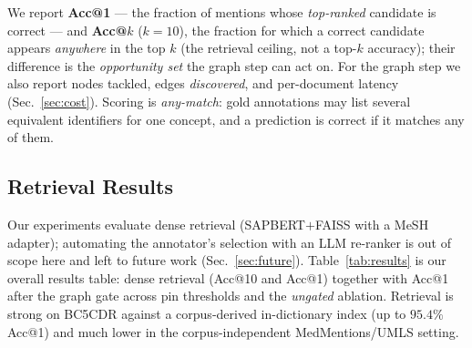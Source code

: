 \documentclass[runningheads]{llncs}
\begin{document}
\begin{table}[t]
\caption{Evaluation datasets and their role. Mentions as train\,/\,dev\,/\,test
where applicable; KB = target knowledge base. BC5CDR and the BioNNE-R case study
drive the graph analysis; MedMentions establishes the retrieval gap.}
\label{tab:datasets}
\centering
\footnotesize
{}
\end{table}

We report \textbf{Acc@1} --- the fraction of mentions whose \emph{top-ranked}
candidate is correct --- and \textbf{Acc@$k$} ($k{=}10$), the fraction for which a
correct candidate appears \emph{anywhere} in the top $k$ (the retrieval ceiling, not
a top-$k$ accuracy); their difference is the \emph{opportunity set} the graph step
can act on. For the graph step we also report nodes tackled, edges
\emph{discovered}, and per-document latency (Sec.~\ref{sec:cost}). Scoring is
\emph{any-match}: gold annotations may list several equivalent identifiers for one
concept, and a prediction is correct if it matches any of them.

\subsection{Retrieval Results}
Our experiments evaluate dense retrieval (SAPBERT$+$FAISS with a MeSH adapter);
automating the annotator's selection with an LLM re-ranker is out of scope here and
left to future work (Sec.~\ref{sec:future}).
Table~\ref{tab:results} is our overall results table: dense retrieval (Acc@10 and
Acc@1) together with Acc@1 after the graph gate across pin thresholds and the
\emph{ungated} ablation. Retrieval is strong on BC5CDR against a corpus-derived
in-dictionary index (up to $95.4\%$ Acc@1) and much lower in the corpus-independent
MedMentions/UMLS setting.
\end{document}
